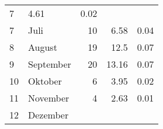 \begin{longtable}{lXrrr}
       \num{7} &
       \num[round-mode=places,round-precision=2]{4.61} &
         \num[round-mode=places,round-precision=2]{0.02} \\

     7 &
     \multicolumn{1}{X}{ Juli   } &


       \num{10} &
       \num[round-mode=places,round-precision=2]{6.58} &
         \num[round-mode=places,round-precision=2]{0.04} \\

     8 &
     \multicolumn{1}{X}{ August   } &


       \num{19} &
       \num[round-mode=places,round-precision=2]{12.5} &
         \num[round-mode=places,round-precision=2]{0.07} \\

     9 &
     \multicolumn{1}{X}{ September   } &


       \num{20} &
       \num[round-mode=places,round-precision=2]{13.16} &
         \num[round-mode=places,round-precision=2]{0.07} \\

     10 &
     \multicolumn{1}{X}{ Oktober   } &


       \num{6} &
       \num[round-mode=places,round-precision=2]{3.95} &
         \num[round-mode=places,round-precision=2]{0.02} \\

     11 &
     \multicolumn{1}{X}{ November   } &


       \num{4} &
       \num[round-mode=places,round-precision=2]{2.63} &
         \num[round-mode=places,round-precision=2]{0.01} \\

     12 &
     \multicolumn{1}{X}{ Dezember   } &



\end{longtable}
